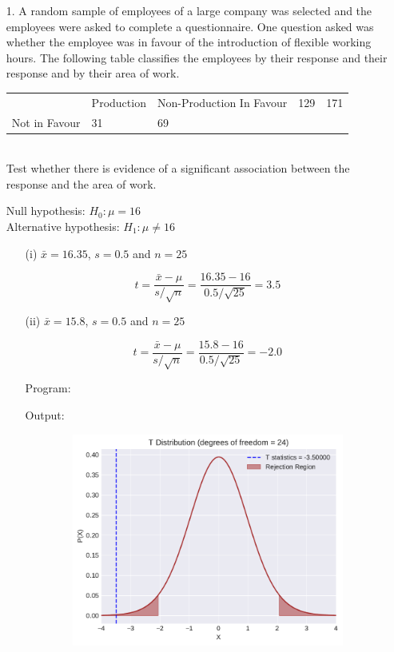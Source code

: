 \documentclass[a4paper,10pt,openright]{report}
\begin{document}
\begin{enumerate}

\item[1.] A random sample of employees of a large company was selected and the employees
were asked to complete a questionnaire. One question asked was whether the employee was in
favour of the introduction of flexible working hours. The following table classifies the
employees by their response and their response and by their area of work. \\

\begin{tabular}{lll}
		      & Production & Non-Production
In Favour     & 129        & 171 \\
Not in Favour & 31         & 69 \\
\end{tabular} \\

Test whether there is evidence of a significant association between the response and the
area of work.

Null hypothesis: $H_{0}: \mu = 16$ \\
Alternative hypothesis: $H_{1}: \mu \neq 16$ 

\begin{enumerate}
\item[(i)] $\bar x = 16.35$, $s = 0.5$ and $n = 25$ 

\begin{equation*}
t = \frac{\bar x - \mu}{s/\sqrt{n}}
  = \frac{16.35 - 16}{0.5/\sqrt{25}} 
  = 3.5
\end{equation*}

\item[(ii)] $\bar x = 15.8$, $s = 0.5$ and $n = 25$

\begin{equation*}
t = \frac{\bar x - \mu}{s/\sqrt{n}}
  = \frac{15.8 - 16}{0.5/\sqrt{25}}
  = -2.0
\end{equation*}	

\vspace{0.5cm}

Program:


Output:


\begin{figure}[ht!]
\includegraphics[width=14cm,height=7cm,keepaspectratio]{tscript1a.pdf}
\centering
\end{figure}


\end{enumerate}
\end{enumerate}
\end{document}
